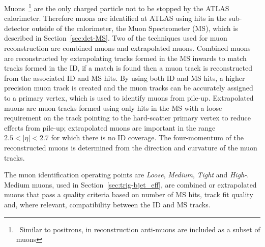 Muons~\footnote{\ Similar to positrons, in reconstruction anti-muons are included as a subset of muons}
are the only charged particle not to be stopped by the ATLAS calorimeter.
Therefore muons are identified at ATLAS using hits in the sub-detector outside of the calorimeter, the Muon Spectrometer (MS), which is described in Section~\ref{sec:det-MS}.
Two of the techniques used for muon reconstruction are combined muons and extrapolated muons.
Combined muons are reconstructed by extrapolating tracks formed in the MS inwards to match tracks formed in the ID,
if a match is found then a muon track is reconstructed from the associated ID and MS hits.
By using both ID and MS hits, a higher precision muon track is created
and the muon tracks can be accurately assigned to a primary vertex, which is used to identify muons from pile-up.
Extrapolated muons are muon tracks formed using only hits in the MS
with a loose requirement on the track pointing to the hard-scatter primary vertex to reduce effects from pile-up;
extrapolated muons are important in the range $2.5 < |\eta| < 2.7$ for which there is no ID coverage.
The four-momentum of the reconstructed muons is determined from the direction and curvature of the muon tracks.

The muon identification operating points are \textit{Loose}, \textit{Medium}, \textit{Tight} and \textit{High-\pT{}}.
Medium muons, used in Section~\ref{sec:trig-bjet_eff}, are combined or extrapolated muons that pass a quality criteria based on
number of MS hits, track fit quality and, where relevant, compatibility between the ID and MS tracks.

%
